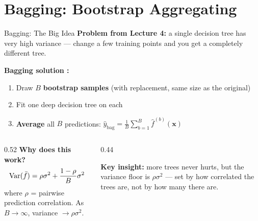 \documentclass[aspectratio=169, 11pt]{beamer}
\begin{document}
\section{Bagging: Bootstrap Aggregating}


\begin{frame}{Bagging: The Big Idea}
  \textbf{Problem from Lecture 4:} a single decision tree has very high variance ---
  change a few training points and you get a completely different tree.

  \textbf{Bagging solution \parencite{Breiman1996}:}
  \begin{enumerate}\small\itemsep0pt
    \item Draw $B$ \textbf{bootstrap samples} (with replacement, same size as the original)
    \item Fit one deep decision tree on each
    \item \textbf{Average} all $B$ predictions:
          $\hat{y}_{\text{bag}} = \tfrac{1}{B}\sum_{b=1}^{B} \hat{f}^{(b)}(\mathbf{x})$
  \end{enumerate}
  \begin{columns}[T]
    \begin{column}{0.52\textwidth}
      \textbf{Why does this work?}
      \[
        \operatorname{Var}(\bar{f}) = \rho\sigma^2 + \frac{1-\rho}{B}\sigma^2
      \]
      where $\rho$ = pairwise prediction correlation.
      As $B \to \infty$, variance $\to \rho\sigma^2$.
    \end{column}
    \begin{column}{0.44\textwidth}
      \begin{keybox}
        \small \textbf{Key insight:} more trees never hurts, but the variance floor is
        $\rho\sigma^2$ --- set by how correlated the trees are, not by how many there are.
      \end{keybox}
    \end{column}
  \end{columns}
\end{frame}
\end{document}
